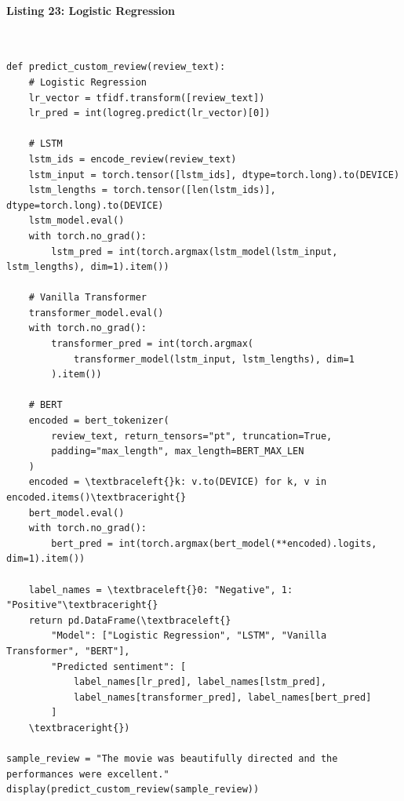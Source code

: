 \documentclass[12pt,a4paper,oneside]{report}
\begin{document}
\paragraph{Listing 23: Logistic Regression}\mbox{}\\[-1ex]
\begin{Verbatim}[commandchars=\\\{\},breaklines=true,breakanywhere=true,fontsize=\scriptsize,frame=leftline,framesep=2mm,rulecolor=\color{gray}]
def predict_custom_review(review_text):
    # Logistic Regression
    lr_vector = tfidf.transform([review_text])
    lr_pred = int(logreg.predict(lr_vector)[0])

    # LSTM
    lstm_ids = encode_review(review_text)
    lstm_input = torch.tensor([lstm_ids], dtype=torch.long).to(DEVICE)
    lstm_lengths = torch.tensor([len(lstm_ids)], dtype=torch.long).to(DEVICE)
    lstm_model.eval()
    with torch.no_grad():
        lstm_pred = int(torch.argmax(lstm_model(lstm_input, lstm_lengths), dim=1).item())

    # Vanilla Transformer
    transformer_model.eval()
    with torch.no_grad():
        transformer_pred = int(torch.argmax(
            transformer_model(lstm_input, lstm_lengths), dim=1
        ).item())

    # BERT
    encoded = bert_tokenizer(
        review_text, return_tensors="pt", truncation=True,
        padding="max_length", max_length=BERT_MAX_LEN
    )
    encoded = \textbraceleft{}k: v.to(DEVICE) for k, v in encoded.items()\textbraceright{}
    bert_model.eval()
    with torch.no_grad():
        bert_pred = int(torch.argmax(bert_model(**encoded).logits, dim=1).item())

    label_names = \textbraceleft{}0: "Negative", 1: "Positive"\textbraceright{}
    return pd.DataFrame(\textbraceleft{}
        "Model": ["Logistic Regression", "LSTM", "Vanilla Transformer", "BERT"],
        "Predicted sentiment": [
            label_names[lr_pred], label_names[lstm_pred],
            label_names[transformer_pred], label_names[bert_pred]
        ]
    \textbraceright{})

sample_review = "The movie was beautifully directed and the performances were excellent."
display(predict_custom_review(sample_review))
\end{Verbatim}
\end{document}
